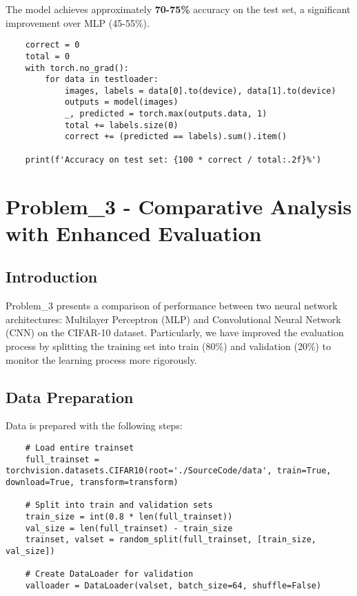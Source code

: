\documentclass[12pt]{article}
\begin{document}
The model achieves approximately \textbf{70-75\%} accuracy on the test set, a significant 
improvement over MLP (45-55\%).

\begin{verbatim}
    correct = 0
    total = 0
    with torch.no_grad():
        for data in testloader:
            images, labels = data[0].to(device), data[1].to(device)
            outputs = model(images)
            _, predicted = torch.max(outputs.data, 1)
            total += labels.size(0)
            correct += (predicted == labels).sum().item()

    print(f'Accuracy on test set: {100 * correct / total:.2f}%')
\end{verbatim}

\section{Problem\_3 - Comparative Analysis with Enhanced Evaluation}

\subsection{Introduction}

Problem\_3 presents a comparison of performance between two neural network 
architectures: Multilayer Perceptron (MLP) and Convolutional Neural Network (CNN) 
on the CIFAR-10 dataset. Particularly, we have improved the evaluation process by 
splitting the training set into train (80\%) and validation (20\%) to monitor the 
learning process more rigorously.

\subsection{Data Preparation}

Data is prepared with the following steps:

\begin{verbatim}
    # Load entire trainset
    full_trainset = torchvision.datasets.CIFAR10(root='./SourceCode/data', train=True, download=True, transform=transform)

    # Split into train and validation sets
    train_size = int(0.8 * len(full_trainset))
    val_size = len(full_trainset) - train_size
    trainset, valset = random_split(full_trainset, [train_size, val_size])

    # Create DataLoader for validation
    valloader = DataLoader(valset, batch_size=64, shuffle=False)
\end{verbatim}
\end{document}
